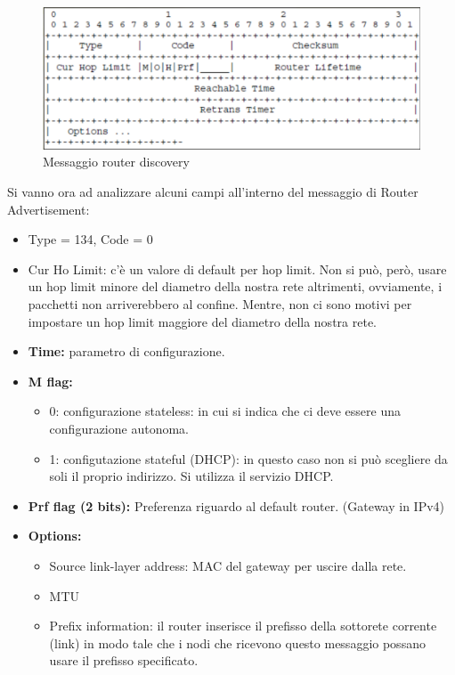 \documentclass{article}
\begin{document}
\begin{figure}[H]
\centering
\includegraphics[scale=0.3]{figures/router discovery.png}
\caption{Messaggio router discovery}
\end{figure}
Si vanno ora ad analizzare alcuni campi all'interno del messaggio di Router Advertisement:
\begin{itemize}
    \item Type = 134, Code = 0
    \item Cur Ho Limit: c'è un valore di default per hop limit. Non si può, però, usare un hop limit minore del diametro della nostra rete altrimenti, ovviamente, i pacchetti non arriverebbero al confine. Mentre, non ci sono motivi per impostare un hop limit maggiore del diametro della nostra rete.
    \item \textbf{Time:} parametro di configurazione.
    \item \textbf{M flag:} 
        \begin{itemize}
            \item 0: configurazione stateless: in cui si indica che ci deve essere una configurazione autonoma.
            \item 1: configutazione stateful (DHCP): in questo caso non si può scegliere da soli il proprio indirizzo. Si utilizza il servizio DHCP.
        \end{itemize}
    \item \textbf{Prf flag (2 bits):} Preferenza riguardo al default router. (Gateway in IPv4)
    \item \textbf{Options:}
        \begin{itemize}
            \item Source link-layer address: MAC del gateway per uscire dalla rete.
            \item MTU
            \item Prefix information: il router inserisce il prefisso della sottorete corrente (link) in modo tale che i nodi che ricevono questo messaggio possano usare il prefisso specificato.
        \end{itemize}

\end{itemize}
\end{document}
